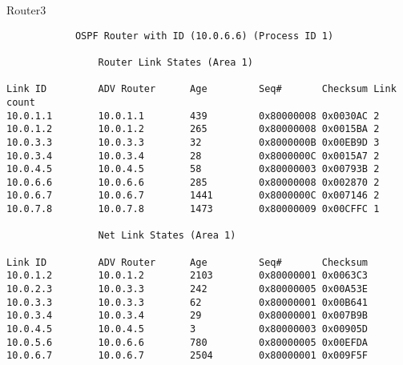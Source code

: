 Router3
\begin{lstlisting}
            OSPF Router with ID (10.0.6.6) (Process ID 1)                       
                                                                                
                Router Link States (Area 1)                                     
                                                                                
Link ID         ADV Router      Age         Seq#       Checksum Link count      
10.0.1.1        10.0.1.1        439         0x80000008 0x0030AC 2               
10.0.1.2        10.0.1.2        265         0x80000008 0x0015BA 2               
10.0.3.3        10.0.3.3        32          0x8000000B 0x00EB9D 3               
10.0.3.4        10.0.3.4        28          0x8000000C 0x0015A7 2               
10.0.4.5        10.0.4.5        58          0x80000003 0x00793B 2               
10.0.6.6        10.0.6.6        285         0x80000008 0x002870 2               
10.0.6.7        10.0.6.7        1441        0x8000000C 0x007146 2               
10.0.7.8        10.0.7.8        1473        0x80000009 0x00CFFC 1               
                                                                                
                Net Link States (Area 1)                                        
                                                                                
Link ID         ADV Router      Age         Seq#       Checksum                 
10.0.1.2        10.0.1.2        2103        0x80000001 0x0063C3                 
10.0.2.3        10.0.3.3        242         0x80000005 0x00A53E                 
10.0.3.3        10.0.3.3        62          0x80000001 0x00B641                 
10.0.3.4        10.0.3.4        29          0x80000001 0x007B9B                 
10.0.4.5        10.0.4.5        3           0x80000003 0x00905D                 
10.0.5.6        10.0.6.6        780         0x80000005 0x00EFDA                 
10.0.6.7        10.0.6.7        2504        0x80000001 0x009F5F 
\end{lstlisting}

